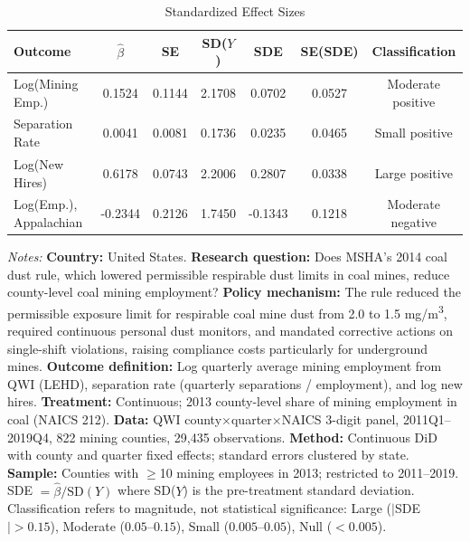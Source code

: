 \begin{table}[htbp]
\centering
\caption{Standardized Effect Sizes}
\label{tab:sde}
\begin{threeparttable}
\small
\begin{tabular}{lcccccc}
\toprule
Outcome & $\hat{\beta}$ & SE & SD($Y$) & SDE & SE(SDE) & Classification \\
\midrule
Log(Mining Emp.) & 0.1524 & 0.1144 & 2.1708 & 0.0702 & 0.0527 & Moderate positive \\
Separation Rate & 0.0041 & 0.0081 & 0.1736 & 0.0235 & 0.0465 & Small positive \\
Log(New Hires) & 0.6178 & 0.0743 & 2.2006 & 0.2807 & 0.0338 & Large positive \\
Log(Emp.), Appalachian & -0.2344 & 0.2126 & 1.7450 & -0.1343 & 0.1218 & Moderate negative \\
\bottomrule
\end{tabular}
\begin{tablenotes}[flushleft]\small
\item \textit{Notes:} \textbf{Country:} United States. \textbf{Research question:} Does MSHA's 2014 coal dust rule, which lowered permissible respirable dust limits in coal mines, reduce county-level coal mining employment? \textbf{Policy mechanism:} The rule reduced the permissible exposure limit for respirable coal mine dust from 2.0 to 1.5 mg/m\textsuperscript{3}, required continuous personal dust monitors, and mandated corrective actions on single-shift violations, raising compliance costs particularly for underground mines. \textbf{Outcome definition:} Log quarterly average mining employment from QWI (LEHD), separation rate (quarterly separations / employment), and log new hires. \textbf{Treatment:} Continuous; 2013 county-level share of mining employment in coal (NAICS 212). \textbf{Data:} QWI county$\times$quarter$\times$NAICS 3-digit panel, 2011Q1--2019Q4, 822 mining counties, 29,435 observations. \textbf{Method:} Continuous DiD with county and quarter fixed effects; standard errors clustered by state. \textbf{Sample:} Counties with $\geq$10 mining employees in 2013; restricted to 2011--2019. SDE $= \hat{\beta} / \text{SD}(Y)$ where SD($Y$) is the pre-treatment standard deviation. Classification refers to magnitude, not statistical significance: Large ($|$SDE$| > 0.15$), Moderate ($0.05$--$0.15$), Small ($0.005$--$0.05$), Null ($< 0.005$).
\end{tablenotes}
\end{threeparttable}
\end{table}

